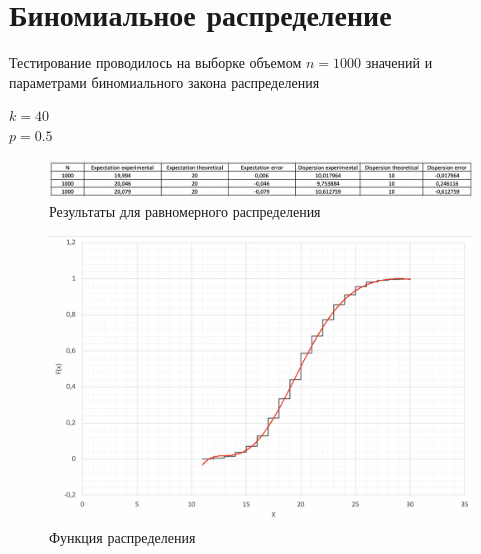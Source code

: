 \documentclass{article}
\begin{document}
	\section{Биномиальное распределение}
		Тестирование проводилось на выборке объемом $n = 1000$ значений и параметрами биномиального закона распределения
		\begin{center}
			$k = 40$\\ 
			$p = 0.5$\\
		\end{center}
		\begin{center}
			\begin{figure}[!htb]
				\includegraphics[scale = 0.61]{binom/3.png}
				\caption{Результаты для равномерного распределения}
			\end{figure}
		\end{center}
		
		\begin{figure}[!htb]
		    \includegraphics[scale = 0.32]{binom/2.png}
    		\caption{Функция распределения}
		\end{figure}
		 	 	
\end{document}
